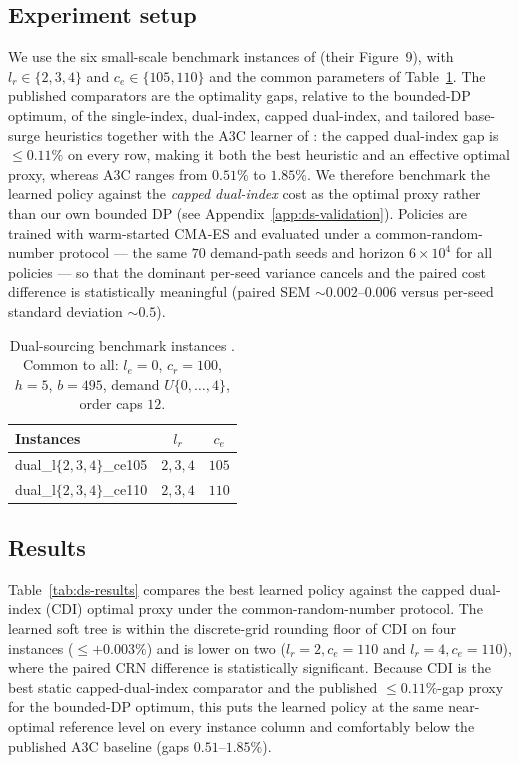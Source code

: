 \documentclass[11pt]{article}
\begin{document}
\subsection{Experiment setup}

We use the six small-scale benchmark instances of \citet{gijsbrechts2022drl} (their Figure~9),
with $l_r\in\{2,3,4\}$ and $c_e\in\{105,110\}$ and the common parameters of
Table~\ref{tab:ds-params}. The published comparators are the optimality gaps, relative to the
bounded-DP optimum, of the single-index, dual-index, capped dual-index, and tailored base-surge
heuristics together with the A3C learner of \citet{gijsbrechts2022drl}: the capped dual-index gap
is $\le0.11\%$ on every row, making it both the best heuristic and an effective optimal proxy,
whereas A3C ranges from $0.51\%$ to $1.85\%$. We therefore benchmark the learned policy against the
\emph{capped dual-index} cost as the optimal proxy rather than our own bounded DP
(see Appendix~\ref{app:ds-validation}). Policies are trained with warm-started CMA-ES and evaluated
under a common-random-number protocol --- the same $70$ demand-path seeds and horizon $6\times10^4$
for all policies --- so that the dominant per-seed variance cancels and the paired cost difference
is statistically meaningful (paired SEM $\sim0.002$--$0.006$ versus per-seed standard deviation
$\sim0.5$).

\begin{table}[!htbp]
\centering
\caption{Dual-sourcing benchmark instances \citep{gijsbrechts2022drl}. Common to all:
$l_e=0$, $c_r=100$, $h=5$, $b=495$, demand $U\{0,\dots,4\}$, order caps $12$.}
\label{tab:ds-params}
\begin{tabular}{lcc}
\toprule
Instances & $l_r$ & $c_e$ \\
\midrule
dual\_l$\{2,3,4\}$\_ce105 & $2,3,4$ & $105$ \\
dual\_l$\{2,3,4\}$\_ce110 & $2,3,4$ & $110$ \\
\bottomrule
\end{tabular}
\end{table}
\FloatBarrier

\subsection{Results}

Table~\ref{tab:ds-results} compares the best learned policy against the capped dual-index (CDI)
optimal proxy under the common-random-number protocol. The learned soft tree is within the
discrete-grid rounding floor of CDI on four instances ($\le+0.003\%$) and is lower on two
($l_r=2,c_e=110$ and $l_r=4,c_e=110$), where the paired CRN difference is statistically significant.
Because CDI is the best static capped-dual-index comparator and the published $\le0.11\%$-gap proxy
for the bounded-DP optimum, this puts the learned policy at the same near-optimal reference level on
every instance column and comfortably below the published A3C baseline (gaps $0.51$--$1.85\%$).
\end{document}
